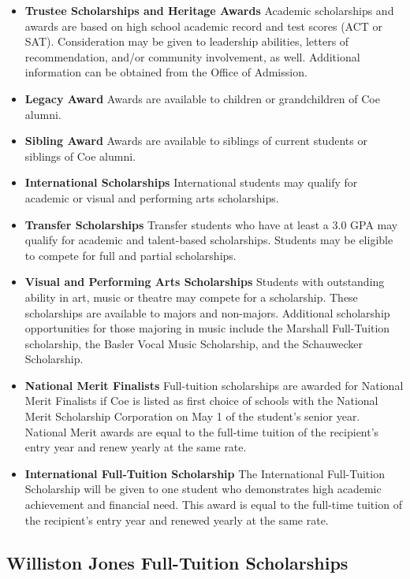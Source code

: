 \documentclass[
  letterpaper,
]{scrbook}
\providecommand{\tightlist}{%
  \setlength{\itemsep}{0pt}\setlength{\parskip}{0pt}}
\begin{document}
\begin{itemize}
\tightlist
\item
  \textbf{Trustee Scholarships and Heritage Awards} Academic
  scholarships and awards are based on high school academic record and
  test scores (ACT or SAT). Consideration may be given to leadership
  abilities, letters of recommendation, and/or community involvement, as
  well. Additional information can be obtained from the Office of
  Admission.
\item
  \textbf{Legacy Award} Awards are available to children or
  grandchildren of Coe alumni.
\item
  \textbf{Sibling Award} Awards are available to siblings of current
  students or siblings of Coe alumni.
\item
  \textbf{International Scholarships} International students may qualify
  for academic or visual and performing arts scholarships.
\item
  \textbf{Transfer Scholarships} Transfer students who have at least a
  3.0 GPA may qualify for academic and talent-based scholarships.
  Students may be eligible to compete for full and partial scholarships.
\item
  \textbf{Visual and Performing Arts Scholarships} Students with
  outstanding ability in art, music or theatre may compete for a
  scholarship. These scholarships are available to majors and
  non-majors. Additional scholarship opportunities for those majoring in
  music include the Marshall Full-Tuition scholarship, the Basler Vocal
  Music Scholarship, and the Schauwecker Scholarship.
\item
  \textbf{National Merit Finalists} Full-tuition scholarships are
  awarded for National Merit Finalists if Coe is listed as first choice
  of schools with the National Merit Scholarship Corporation on May 1 of
  the student's senior year. National Merit awards are equal to the
  full-time tuition of the recipient's entry year and renew yearly at
  the same rate.
\item
  \textbf{International Full-Tuition Scholarship} The International
  Full-Tuition Scholarship will be given to one student who demonstrates
  high academic achievement and financial need. This award is equal to
  the full-time tuition of the recipient's entry year and renewed yearly
  at the same rate.
\end{itemize}

\subsection{Williston Jones Full-Tuition
Scholarships}\label{williston-jones-full-tuition-scholarships}
\end{document}

